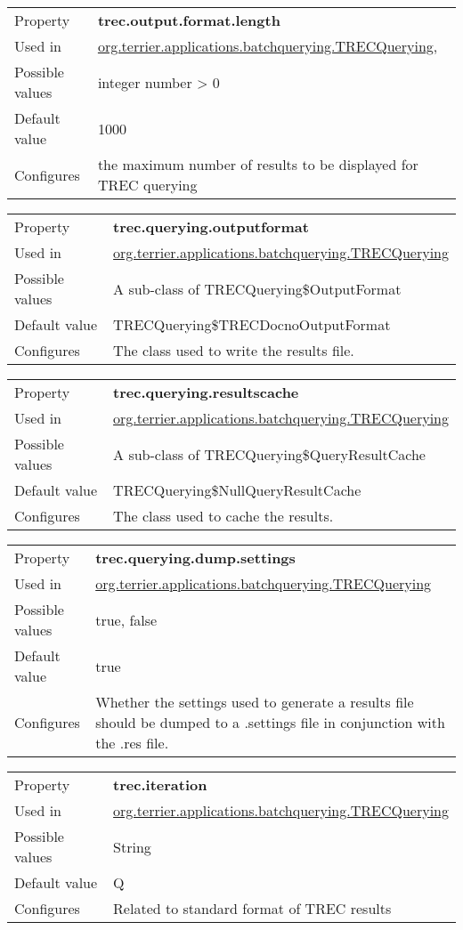 \begin{longtable}[]{@{}ll@{}}
\toprule
Property & \textbf{trec.output.format.length}\tabularnewline
Used in &
\href{javadoc/org/terrier/applications/batchquerying/TRECQuerying.html}{org.terrier.applications.batchquerying.TRECQuerying},\tabularnewline
Possible values & integer number \textgreater{} 0\tabularnewline
Default value & 1000\tabularnewline
Configures & the maximum number of results to be displayed for TREC
querying\tabularnewline
\bottomrule
\end{longtable}

\begin{longtable}[]{@{}ll@{}}
\toprule
Property & \textbf{trec.querying.outputformat}\tabularnewline
Used in &
\href{javadoc/org/terrier/applications/batchquerying/TRECQuerying.html}{org.terrier.applications.batchquerying.TRECQuerying}\tabularnewline
Possible values & A sub-class of
TRECQuerying\$OutputFormat\tabularnewline
Default value & TRECQuerying\$TRECDocnoOutputFormat\tabularnewline
Configures & The class used to write the results file.\tabularnewline
\bottomrule
\end{longtable}

\begin{longtable}[]{@{}ll@{}}
\toprule
Property & \textbf{trec.querying.resultscache}\tabularnewline
Used in &
\href{javadoc/org/terrier/applications/batchquerying/TRECQuerying.html}{org.terrier.applications.batchquerying.TRECQuerying}\tabularnewline
Possible values & A sub-class of
TRECQuerying\$QueryResultCache\tabularnewline
Default value & TRECQuerying\$NullQueryResultCache\tabularnewline
Configures & The class used to cache the results.\tabularnewline
\bottomrule
\end{longtable}

\begin{longtable}[]{@{}ll@{}}
\toprule
Property & \textbf{trec.querying.dump.settings}\tabularnewline
Used in &
\href{javadoc/org/terrier/applications/batchquerying/TRECQuerying.html}{org.terrier.applications.batchquerying.TRECQuerying}\tabularnewline
Possible values & true, false\tabularnewline
Default value & true\tabularnewline
Configures & Whether the settings used to generate a results file should
be dumped to a .settings file in conjunction with the .res
file.\tabularnewline
\bottomrule
\end{longtable}

\begin{longtable}[]{@{}ll@{}}
\toprule
Property & \textbf{trec.iteration}\tabularnewline
Used in &
\href{javadoc/org/terrier/applications/batchquerying/TRECQuerying.html}{org.terrier.applications.batchquerying.TRECQuerying}\tabularnewline
Possible values & String\tabularnewline
Default value & Q\tabularnewline
Configures & Related to standard format of TREC results\tabularnewline
\bottomrule
\end{longtable}


